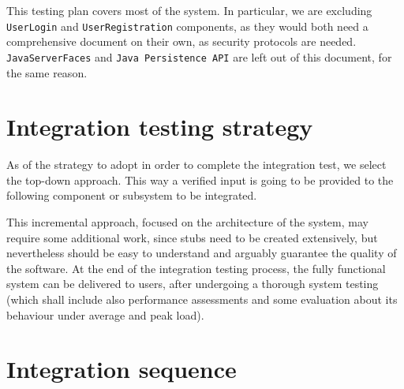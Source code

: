 This testing plan covers most of the system. In particular, we are excluding \texttt{User\-Login} and \texttt{User\-Registration} components, as they would both need a comprehensive document on their own, as security protocols are needed. \texttt{Java\-Server\-Faces} and \texttt{Java Persistence API} are left out of this document, for the same reason.



\section{Integration testing strategy}
As of the strategy to adopt in order to complete the integration test, we select the \mbox{top-down} approach. This way a verified input is going to be provided to the following component or subsystem to be integrated.

This incremental approach, focused on the architecture of the system, may require some additional work, since stubs need to be created extensively, but nevertheless should be easy to understand and arguably guarantee the quality of the software. At the end of the integration testing process, the fully functional system can be delivered to users, after undergoing a thorough system testing (which shall include also performance assessments and some evaluation about its behaviour under average and peak load).





\section{Integration sequence}

